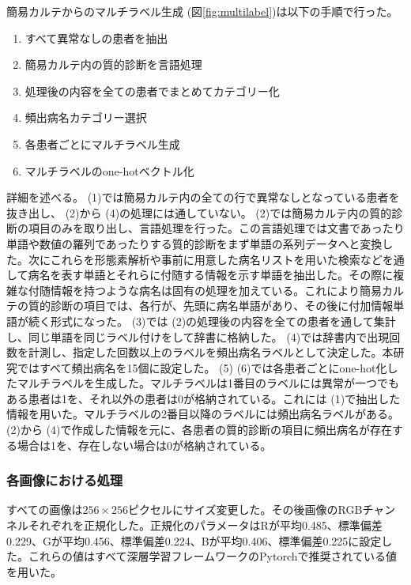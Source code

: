 簡易カルテからのマルチラベル生成 (図\ref{fig:multilabel})は以下の手順で行った。
\begin{enumerate}
    \item すべて異常なしの患者を抽出
    \item 簡易カルテ内の質的診断を言語処理
    \item 処理後の内容を全ての患者でまとめてカテゴリー化
    \item 頻出病名カテゴリー選択
    \item 各患者ごとにマルチラベル生成
    \item マルチラベルのone-hotベクトル化
\end{enumerate}
詳細を述べる。 (1)では簡易カルテ内の全ての行で異常なしとなっている患者を抜き出し、 (2)から (4)の処理には通していない。 (2)では簡易カルテ内の質的診断の項目のみを取り出し、言語処理を行った。この言語処理では文書であったり単語や数値の羅列であったりする質的診断をまず単語の系列データへと変換した。次にこれらを形態素解析や事前に用意した病名リストを用いた検索などを通して病名を表す単語とそれらに付随する情報を示す単語を抽出した。その際に複雑な付随情報を持つような病名は固有の処理を加えている。これにより簡易カルテの質的診断の項目では、各行が、先頭に病名単語があり、その後に付加情報単語が続く形式になった。 (3)では (2)の処理後の内容を全ての患者を通して集計し、同じ単語を同じラベル付けをして辞書に格納した。 (4)では辞書内で出現回数を計測し、指定した回数以上のラベルを頻出病名ラベルとして決定した。本研究ではすべて頻出病名を15個に設定した。 (5) (6)では各患者ごとにone-hot化したマルチラベルを生成した。マルチラベルは1番目のラベルには異常が一つでもある患者は1を、それ以外の患者は0が格納されている。これには (1)で抽出した情報を用いた。マルチラベルの2番目以降のラベルには頻出病名ラベルがある。 (2)から (4)で作成した情報を元に、各患者の質的診断の項目に頻出病名が存在する場合は1を、存在しない場合は0が格納されている。
\subsubsection{各画像における処理}
すべての画像は$256 \times 256$ピクセルにサイズ変更した。その後画像のRGBチャンネルそれぞれを正規化した。正規化のパラメータはRが平均0.485、標準偏差0.229、Gが平均0.456、標準偏差0.224、Bが平均0.406、標準偏差0.225に設定した。これらの値はすべて深層学習フレームワークのPytorchで推奨されている値を用いた。
